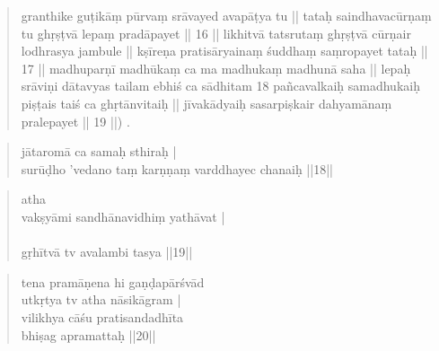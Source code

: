 \documentclass [12pt]{article}%
\begin{document}
\begin{sanskrit}
\begin{verse}
{{  granthike guṭikāṃ pūrvaṃ srāvayed avapāṭya tu ||  
  tataḥ saindhavacūrṇaṃ tu ghṛṣṭvā lepaṃ pradāpayet || 16 ||
  likhitvā tatsrutaṃ ghṛṣṭvā cūrṇair lodhrasya jambule ||  
  kṣīreṇa pratisāryainaṃ śuddhaṃ saṃropayet tataḥ || 17 ||
  madhuparṇī madhūkaṃ ca ma madhukaṃ madhunā saha ||  
  lepaḥ srāviṇi dātavyas tailam ebhiś ca sādhitam 18 
  pañcavalkaiḥ samadhukaiḥ piṣṭais taiś ca ghṛtānvitaiḥ ||  
  jīvakādyaiḥ sasarpiṣkair dahyamānaṃ pralepayet || 19 ||) \A.}
}
 \end{verse} 
\pend\bigskip
%
%
\pstart
\begin{verse}
jātaromā\emph{}  ca  samaḥ sthiraḥ |\\
surūḍho 'vedano   taṃ karṇṇaṃ varddhayec chanaiḥ ||18|| 
\end{verse}
\pend\bigskip


\pstart
\begin{verse}
 atha \\
vakṣyāmi sandhānavidhiṃ yathāvat |\\ 
   \\  
 gṛhītvā tv avalambi tasya 
||19||
 \end{verse}
\pend\bigskip


\pstart
\begin{verse}
 tena pramāṇena hi gaṇḍapārśvād\\  
 utkṛtya  tv atha nāsikāgram |\\  
vilikhya cāśu pratisandadhīta\\ 
  bhiṣag apramattaḥ ||20|| 
\end{verse}
\pend\bigskip



\end{sanskrit}
\end{document}
